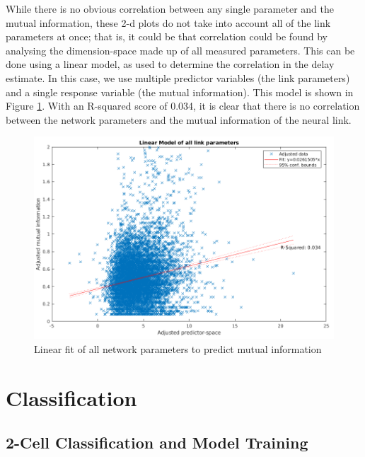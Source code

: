 While there is no obvious correlation between any single parameter and the mutual information, these 2-d plots do not take into account all of the link parameters at once; that is, it could be that correlation could be found by analysing the dimension-space made up of all measured parameters. This can be done using a linear model, as used to determine the correlation in the delay estimate. In this case, we use multiple predictor variables (the link parameters) and a single response variable (the mutual information). This model is shown in Figure \ref{fig:lmInfo}. With an R-squared score of 0.034, it is clear that there is no correlation between the network parameters and the mutual information of the neural link.
\begin{figure}[ht]
    \centering
    \includegraphics[width=\textwidth]{05-Results/lmMinfo.png}
    \caption{Linear fit of all network parameters to predict mutual information}
    \label{fig:lmInfo}
\end{figure}


\section{Classification}

\subsection{2-Cell Classification and Model Training}


